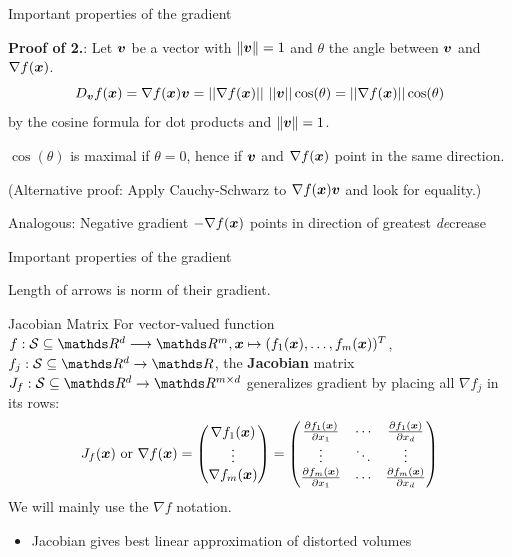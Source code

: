 \documentclass[11pt,compress,t,notes=noshow, xcolor=table]{beamer}
\begin{document}
\begin{framei}{Important properties of the gradient}
\item \textbf{Proof of 2.}: Let $\bm{v}$ be a vector with $\|\bm{v}\|=1$ and $\theta$ the angle between $\bm{v}$ and $\nabla f(\bm{x})$.
$$
D_{\bm{v}}f(\bm{x}) = \nabla f(\bm{x}) \bm{v} = ||\nabla f(\bm{x})||~||\bm{v}||\cos(\theta) = ||\nabla f(\bm{x})|| \cos(\theta)
$$
by the cosine formula for dot products and $\|\bm{v}\| = 1$.
\item $\cos(\theta)$ is maximal if $\theta = 0$, hence if $\bm{v}$ and $\nabla f(\bm{x})$ point in the same direction.
\item (Alternative proof: Apply Cauchy-Schwarz to $\nabla f(\bm{x}) \bm{v}$ and look for equality.)
\item Analogous: Negative gradient $- \nabla f(\bm{x})$ points in direction of greatest \textit{de}crease
\end{framei}


\begin{framev}{Important properties of the gradient}
\begin{center}
\begin{footnotesize}
Length of arrows is norm of their gradient.
\end{footnotesize}
\end{center}
\end{framev}


\begin{framev}{Jacobian Matrix}
For vector-valued function~$f:\S\subseteq \R^d\longrightarrow\R^m, \xv\mapsto(f_1(\xv),\dots,f_m(\xv))^T$, $f_j:\S\subseteq \R^d\to\R$, the \textbf{Jacobian} matrix $J_f:\S\subseteq \R^d \to \R^{m\times d}$ generalizes gradient by placing all $\nabla f_j$ in its rows:
$$
J_f(\bm{x}) \text{ or } \nabla f(\bm{x}) = \begin{pmatrix}
\nabla f_1(\bm{x}) \\
\vdots \\
\nabla f_m(\bm{x})
\end{pmatrix}
=
\begin{pmatrix}
\frac{\partial f_1(\bm{x})}{\partial x_1} & \cdots & \frac{\partial f_1(\bm{x})}{\partial x_d} \\
\vdots &  \ddots & \vdots \\
\frac{\partial f_m(\bm{x})}{\partial x_1} & \cdots & \frac{\partial f_m(\bm{x})}{\partial x_d}
\end{pmatrix}
$$
We will mainly use the $\nabla f$ notation.
\begin{itemize}
\item Jacobian gives best linear approximation of distorted volumes
\end{itemize}
\end{framev}
\end{document}
